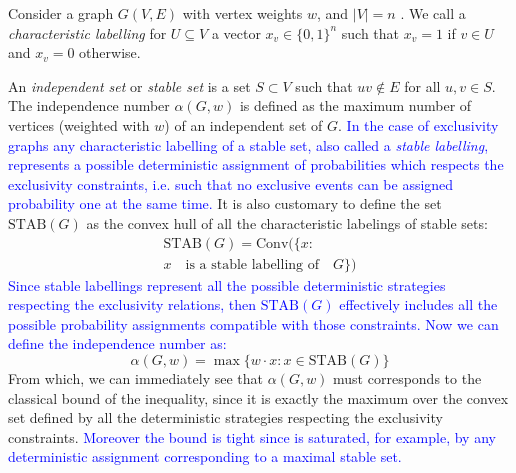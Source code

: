 \documentclass[letterpaper]{article}
\newcommand{\STAB}{\mathrm{STAB}}
\newcommand{\chull}{\mathrm{Conv}}
\begin{document}
Consider a graph $G(V, E)$ with vertex weights $w$, and $|V| = n$ .
We call a \emph{characteristic labelling} for $U \subseteq V$ a vector $x_v \in
\{0,1\}^n$ such that $x_v = 1$ if $v \in U$ and $x_v = 0$ otherwise.

An \emph{independent set} or \emph{stable set} is a set
$S \subset V$ such that $uv \notin E$ for all $u,v \in S$.
The independence number $\alpha(G, w)$ is defined as the maximum number of
vertices (weighted with $w$) of an independent set of $G$. 
\textcolor{blue}{
 In the case of exclusivity graphs any characteristic labelling of
 a stable set, also called a \emph{stable labelling}, represents a
 possible deterministic assignment of probabilities which respects the
 exclusivity constraints, i.e. such that no exclusive events can be
 assigned probability one at the same time.
}
It is also customary to define the set $\STAB(G)$ as the convex hull of
all the characteristic labelings of stable sets:
\begin{multline} 
    \STAB(G) = \chull (\{x : \\ x \quad \text{is a stable labelling of}\quad G \})
    \label{eq:stab}
\end{multline}
\textcolor{blue}{
Since stable labellings represent all the possible deterministic strategies respecting the 
exclusivity relations, then $\STAB(G)$ effectively includes  all the possible 
probability assignments compatible with those constraints.
Now we can define the independence number as:
}
\begin{equation}
    \alpha(G,w) = \max\{w\cdot x: x \in \STAB(G)\}
    \label{eq:alphastab}
\end{equation}
From which, we can immediately see that $\alpha(G,w)$ must corresponds to the
classical bound of the inequality, since it is exactly the maximum over
the convex set defined by all the deterministic strategies respecting
the exclusivity constraints.
\textcolor{blue}{Moreover the bound is tight since is saturated, for example, by
any deterministic assignment corresponding to a maximal stable set.}
\end{document}
